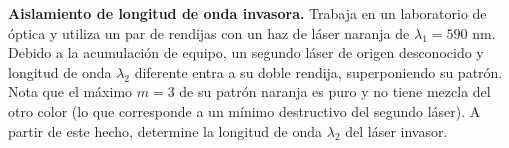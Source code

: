 \item \textbf{Aislamiento de longitud de onda invasora.}
Trabaja en un laboratorio de óptica y utiliza un par de rendijas con un haz de láser naranja de $\lambda_1 = 590\text{ nm}$. Debido a la acumulación de equipo, un segundo láser de origen desconocido y longitud de onda $\lambda_2$ diferente entra a su doble rendija, superponiendo su patrón. Nota que el máximo $m = 3$ de su patrón naranja es puro y no tiene mezcla del otro color (lo que corresponde a un mínimo destructivo del segundo láser). A partir de este hecho, determine la longitud de onda $\lambda_2$ del láser invasor.